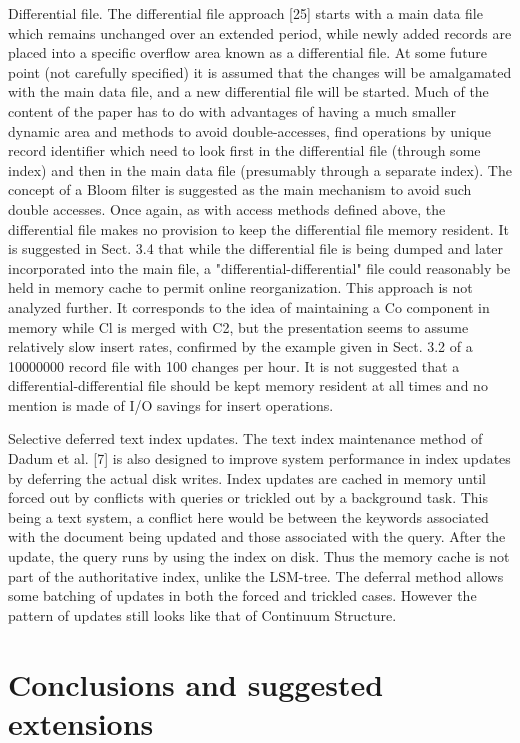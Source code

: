 \documentclass[a4paper,11pt,notitlepage,twoside,openright]{article}
\begin{document}
Differential file. The differential file approach {[}25{]} starts with a
main data file which remains unchanged over an extended period, while
newly added records are placed into a specific overflow area known as a
differential file. At some future point (not carefully specified) it is
assumed that the changes will be amalgamated with the main data file,
and a new differential file will be started. Much of the content of the
paper has to do with advantages of having a much smaller dynamic area
and methods to avoid double-accesses, find operations by unique record
identifier which need to look first in the differential file (through
some index) and then in the main data file (presumably through a
separate index). The concept of a Bloom filter is suggested as the main
mechanism to avoid such double accesses. Once again, as with access
methods defined above, the differential file makes no provision to keep
the differential file memory resident. It is suggested in Sect. 3.4 that
while the differential file is being dumped and later incorporated into
the main file, a "differential-differential" file could reasonably be
held in memory cache to permit online reorganization. This approach is
not analyzed further. It corresponds to the idea of maintaining a Co
component in memory while Cl is merged with C2, but the presentation
seems to assume relatively slow insert rates, confirmed by the example
given in Sect. 3.2 of a 10000000 record file with 100 changes per hour.
It is not suggested that a differential-differential file should be kept
memory resident at all times and no mention is made of I/O savings for
insert operations.

Selective deferred text index updates. The text index maintenance method
of Dadum et al. {[}7{]} is also designed to improve system performance
in index updates by deferring the actual disk writes. Index updates are
cached in memory until forced out by conflicts with queries or trickled
out by a background task. This being a text system, a conflict here
would be between the keywords associated with the document being updated
and those associated with the query. After the update, the query runs by
using the index on disk. Thus the memory cache is not part of the
authoritative index, unlike the LSM-tree. The deferral method allows
some batching of updates in both the forced and trickled cases. However
the pattern of updates still looks like that of Continuum Structure.


\hypertarget{conclusions-and-suggested-extensions}{%
\section{Conclusions and suggested
extensions}\label{conclusions-and-suggested-extensions}}
\end{document}
